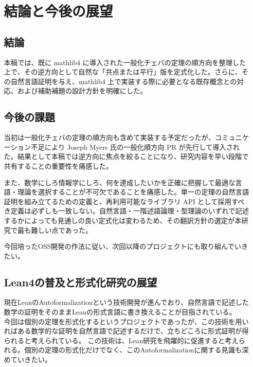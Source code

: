 \documentclass[a4paper,12pt]{bxjsbook}
\newlength{\customindent}
\newenvironment{body}{
  \par
  \begingroup
  \setlength{\leftskip}{\customindent}
  \setlength{\rightskip}{0pt}
  \setlength{\parindent}{1em}
  \setlength{\displayindent}{\customindent}
  \setlength{\displaywidth}{\dimexpr\linewidth-\customindent\relax}
}{
  \par
  \endgroup
}
\theoremstyle{theorem}
\begin{document}
    \chapter{結論と今後の展望}


    \section{結論}
    \begin{body}
        \indent 本稿では、既に mathlib4 に導入された一般化チェバの定理の順方向を整理した上で、その逆方向として自然な「共点または平行」版を定式化した。さらに、その自然言語証明を与え、mathlib4 上で実装する際に必要となる既存概念との対応、および補助補題の設計方針を明確にした。
    \end{body}

    \section{今後の課題}
    \begin{body}
        \indent 当初は一般化チェバの定理の順方向も含めて実装する予定だったが、コミュニケーション不足により Joseph Myers 氏の一般化順方向 PR が先行して導入された。結果として本稿では逆方向に焦点を絞ることになり、研究内容を早い段階で共有することの重要性を痛感した。

        \indent また、数学にしろ情報学にしろ、何を達成したいかを正確に把握して最適な言語・理論を選択することが不可欠であることを痛感した。単一の定理の自然言語証明を組み立てるための定義と、再利用可能なライブラリ API として採用すべき定義は必ずしも一致しない。自然言語・一階述語論理・型理論のいずれで記述するかによっても見通しの良い定式化は変わるため、その翻訳方針の選定が本研究で最も難しい点であった。
        
        \indent 今回培ったOSS開発の作法に従い、次回以降のプロジェクトにも取り組んでいきたい。
    \end{body}

    \section{Lean4の普及と形式化研究の展望}
    \begin{body}
        \indent 現在LeanのAutoformalizationという技術開発が進んでおり、自然言語で記述した数学の証明をそのままLeanの形式言語に書き換えることが目指されている。\\
        今回は個別の定理を形式化するというプロジェクトであったが、この技術を用いればある数学的な証明を自然言語で記述するだけで、立ちどころに形式証明が得られると考えられている。
        この技術は、Lean研究を飛躍的に促進すると考えられる。個別の定理の形式化だけでなく、このAutoformalizationに関する見識も深めていきたい。
    \end{body}
\end{document}
